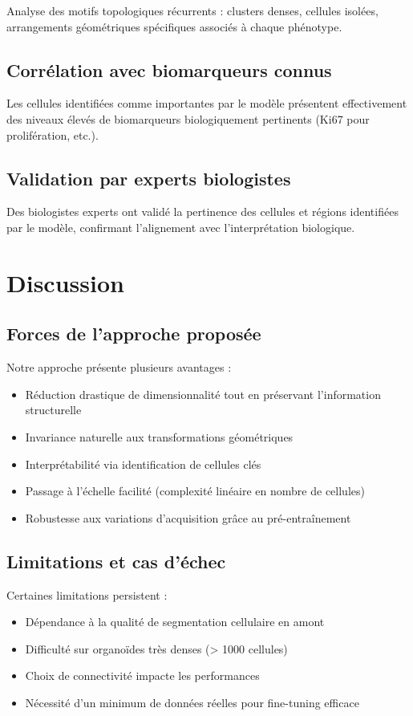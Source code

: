 Analyse des motifs topologiques récurrents : clusters denses, cellules isolées, arrangements géométriques spécifiques associés à chaque phénotype.

\subsection{Corrélation avec biomarqueurs connus}

Les cellules identifiées comme importantes par le modèle présentent effectivement des niveaux élevés de biomarqueurs biologiquement pertinents (Ki67 pour prolifération, etc.).

\subsection{Validation par experts biologistes}

Des biologistes experts ont validé la pertinence des cellules et régions identifiées par le modèle, confirmant l'alignement avec l'interprétation biologique.

\section{Discussion}

\subsection{Forces de l'approche proposée}

Notre approche présente plusieurs avantages :
\begin{itemize}
    \item Réduction drastique de dimensionnalité tout en préservant l'information structurelle
    \item Invariance naturelle aux transformations géométriques
    \item Interprétabilité via identification de cellules clés
    \item Passage à l'échelle facilité (complexité linéaire en nombre de cellules)
    \item Robustesse aux variations d'acquisition grâce au pré-entraînement
\end{itemize}

\subsection{Limitations et cas d'échec}

Certaines limitations persistent :
\begin{itemize}
    \item Dépendance à la qualité de segmentation cellulaire en amont
    \item Difficulté sur organoïdes très denses (> 1000 cellules)
    \item Choix de connectivité impacte les performances
    \item Nécessité d'un minimum de données réelles pour fine-tuning efficace
\end{itemize}

